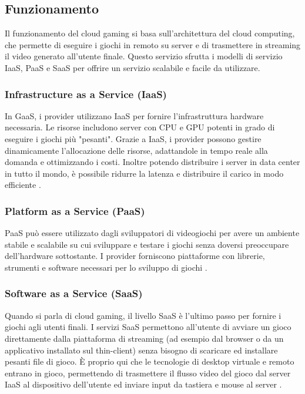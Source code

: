 \documentclass[12pt,a4paper,openright,twoside]{book}
\begin{document}
\subsection{Funzionamento}
\label{subsec:funzionamento}

Il funzionamento del cloud gaming si basa sull'architettura del cloud computing, che permette di eseguire i giochi in remoto su server e di trasmettere in streaming il video generato all'utente finale. Questo servizio sfrutta i modelli di servizio \ac{IaaS}, PaaS e SaaS per offrire un servizio scalabile e facile da utilizzare.

\subsubsection{Infrastructure as a Service (IaaS)}
In GaaS, i provider utilizzano \ac{IaaS} per fornire l'infrastruttura hardware necessaria. Le risorse includono server con CPU e GPU potenti in grado di eseguire i giochi più "pesanti". Grazie a IaaS, i provider possono gestire dinamicamente l'allocazione delle risorse, adattandole in tempo reale alla domanda e ottimizzando i costi. Inoltre potendo distribuire i server in data center in tutto il mondo, è possibile ridurre la latenza e distribuire il carico in modo efficiente \cite{HARLE2023}.

\subsubsection{Platform as a Service (PaaS)}
PaaS può essere utilizzato dagli sviluppatori di videogiochi per avere un ambiente stabile e scalabile su cui sviluppare e testare i giochi senza doversi preoccupare dell'hardware sottostante. I provider forniscono piattaforme con librerie, strumenti e software necessari per lo sviluppo di giochi \cite{HARLE2023}.

\subsubsection{Software as a Service (SaaS)}
Quando si parla di cloud gaming, il livello SaaS è l'ultimo passo per fornire i giochi agli utenti finali. I servizi SaaS permettono all'utente di avviare un gioco direttamente dalla piattaforma di streaming (ad esempio dal browser o da un applicativo installato sul thin-client) senza bisogno di scaricare ed installare pesanti file di gioco. È proprio qui che le tecnologie di desktop virtuale e remoto entrano in gioco, permettendo di trasmettere il flusso video del gioco dal server IaaS al dispositivo dell'utente ed inviare input da tastiera e mouse al server \cite{HARLE2023}.
\end{document}
